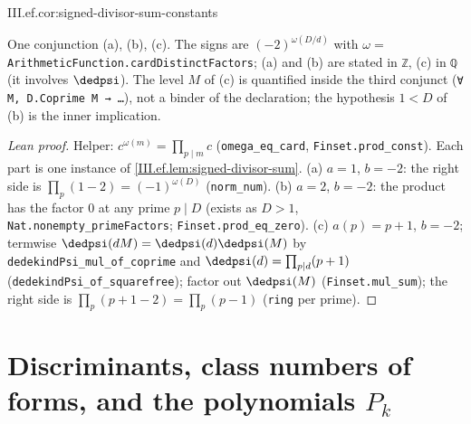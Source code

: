 \begin{corollary}
\end{corollary}
\begin{tfformal}{III.ef.cor:signed-divisor-sum-constants}
\begin{tffidelity}
One conjunction (a), (b), (c). The signs are $(-2)^{\omega(D/d)}$ with $\omega=$ \texttt{ArithmeticFunction.cardDistinctFactors}; (a) and (b) are stated in \texttt{ℤ}, (c) in \texttt{ℚ} (it involves $\dedpsi$). The level $M$ of (c) is quantified inside the third conjunct (\texttt{∀ M, D.Coprime M → \dots}), not a binder of the declaration; the hypothesis $1<D$ of (b) is the inner implication.
\end{tffidelity}
\end{tfformal}
\begin{proof}[Lean proof]
Helper: $c^{\omega(m)}=\prod_{p\mid m}c$ (\texttt{omega\_eq\_card}, \texttt{Finset.prod\_const}). Each part is one instance of \cref{III.ef.lem:signed-divisor-sum}. (a) $a=1$, $b=-2$: the right side is $\prod_p(1-2)=(-1)^{\omega(D)}$ (\texttt{norm\_num}). (b) $a=2$, $b=-2$: the product has the factor $0$ at any prime $p\mid D$ (exists as $D>1$, \texttt{Nat.nonempty\_primeFactors}; \texttt{Finset.prod\_eq\_zero}). (c) $a(p)=p+1$, $b=-2$; termwise $\dedpsi(dM)=\dedpsi(d)\dedpsi(M)$ by \texttt{dedekindPsi\_mul\_of\_coprime} and $\dedpsi(d)=\prod_{p\mid d}(p+1)$ (\texttt{dedekindPsi\_of\_squarefree}); factor out $\dedpsi(M)$ (\texttt{Finset.mul\_sum}); the right side is $\prod_p(p+1-2)=\prod_p(p-1)$ (\texttt{ring} per prime).
\end{proof}

\section{Discriminants, class numbers of forms, and the polynomials \texorpdfstring{$P_k$}{P\_k}}\label{sec:ef-discr}

